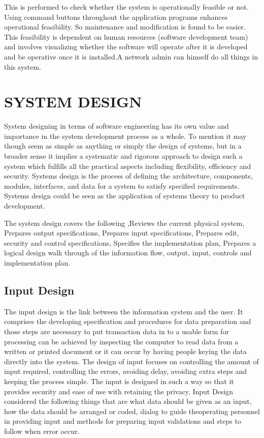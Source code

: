  This is performed to check whether the system is operationally feasible or not. Using command buttons throughout the application programs enhances operational feasibility. So maintenance and modification is found to be easier. This feasibility is dependent on human resources (software development team) and involves visualizing whether the software will operate after it is developed and be operative once it is installed.A network admin can himself do all things in this system.
%
\chapter{SYSTEM DESIGN }

System designing in terms of software engineering has its own value and importance in the system development process as a whole. To mention it may though seem as simple as anything or simply the design of systems, but in a broader sense it implies a systematic and rigorous approach to design such a system which fulfills all the practical aspects including flexibility, efficiency and security. Systems design is the process of defining the architecture, components, modules, interfaces, and data for a system to satisfy specified requirements. Systems design could be seen as the application of systems theory to product development.

The system design covers the following ,Reviews the current physical system,  Prepares output specifications, Prepares input specifications,  Prepares edit, security and control specifications,  Specifies the implementation plan,  Prepares a logical design walk through of the information flow, output, input, controls  and implementation plan. 


%
\section{Input Design}

The input design is the link between the information system and the user. It comprises the developing specification and procedures for data preparation and those steps are necessary to put transaction data in to a usable form for processing can be achieved by inspecting the computer to read data from a written or printed document or it can occur by having people keying the data directly into the system. The design of input focuses on controlling the amount of input required, controlling the errors, avoiding delay, avoiding extra steps and keeping the process simple. The input is designed in such a way so that it provides security and ease of use with retaining the privacy. Input Design considered the following things that are what data should be given as an input, how the data should be arranged or coded, dialog to guide theoperating personnel in providing input and methods for preparing input validations and steps to follow when error occur.
%
